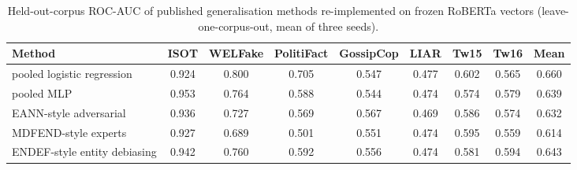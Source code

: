 \begin{table}[h]
\centering
\caption{Held-out-corpus ROC-AUC of published generalisation methods re-implemented on frozen RoBERTa vectors (leave-one-corpus-out, mean of three seeds).}\label{tab:dg}
\footnotesize
\begin{tabular}{@{}lcccccccc@{}}
\toprule
Method & ISOT & WELFake & PolitiFact & GossipCop & LIAR & Tw15 & Tw16 & Mean \\
\midrule
pooled logistic regression & 0.924 & 0.800 & 0.705 & 0.547 & 0.477 & 0.602 & 0.565 & 0.660 \\
pooled MLP & 0.953 & 0.764 & 0.588 & 0.544 & 0.474 & 0.574 & 0.579 & 0.639 \\
EANN-style adversarial & 0.936 & 0.727 & 0.569 & 0.567 & 0.469 & 0.586 & 0.574 & 0.632 \\
MDFEND-style experts & 0.927 & 0.689 & 0.501 & 0.551 & 0.474 & 0.595 & 0.559 & 0.614 \\
ENDEF-style entity debiasing & 0.942 & 0.760 & 0.592 & 0.556 & 0.474 & 0.581 & 0.594 & 0.643 \\
\bottomrule
\end{tabular}
\end{table}
